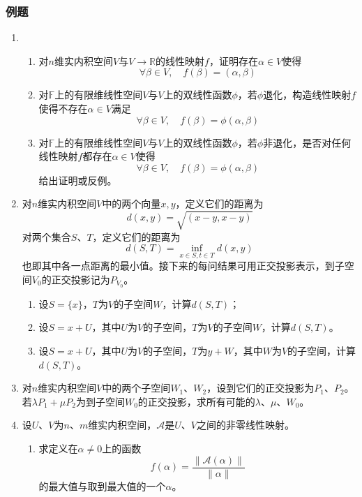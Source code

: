 \documentclass[a4paper,UTF8,fontset=windows,AutoFakeBold]{ctexart}
\newcommand*{\ma}{\mathcal{A}}
\begin{document}
\subsubsection{例题}
\begin{enumerate}
    \item
    \begin{enumerate}
        \item 对$n$维实内积空间$V$与$V\to\mathbb{R}$的线性映射$f$，证明存在$\alpha\in V$使得
        $$\forall\beta\in V,\quad f(\beta)=(\alpha,\beta)$$
        \item 对$\mathbb{F}$上的有限维线性空间$V$与$V$上的双线性函数$\phi$，若$\phi$退化，构造线性映射$f$使得不存在$\alpha\in V$满足
        $$\forall\beta\in V,\quad f(\beta)=\phi(\alpha,\beta)$$
        \item 对$\mathbb{F}$上的有限维线性空间$V$与$V$上的双线性函数$\phi$，若$\phi$非退化，是否对任何线性映射$f$都存在$\alpha\in V$使得
        $$\forall\beta\in V,\quad f(\beta)=\phi(\alpha,\beta)$$
        给出证明或反例。
    \end{enumerate}

    \item
    对$n$维实内积空间$V$中的两个向量$x,y$，定义它们的距离为
    $$d(x,y)=\sqrt{(x-y,x-y)}$$
    对两个集合$S$、$T$，定义它们的距离为
    $$d(S,T)=\inf_{x\in S,t\in T}d(x,y)$$
    也即其中各一点距离的最小值。接下来的每问结果可用正交投影表示，到子空间$V_0$的正交投影记为$P_{V_0}$。
    \begin{enumerate}
        \item 设$S=\{x\}$，$T$为$V$的子空间$W$，计算$d(S,T)$；
        \item 设$S=x+U$，其中$U$为$V$的子空间，$T$为$V$的子空间$W$，计算$d(S,T)$。
        \item 设$S=x+U$，其中$U$为$V$的子空间，$T$为$y+W$，其中$W$为$V$的子空间，计算$d(S,T)$。
    \end{enumerate}

    \item 对$n$维实内积空间$V$中的两个子空间$W_1$、$W_2$，设到它们的正交投影为$P_1$、$P_2$。若$\lambda P_1+\mu P_2$为到子空间$W_0$的正交投影，求所有可能的$\lambda$、$\mu$、$W_0$。

    \item
    设$U$、$V$为$n$、$m$维实内积空间，$\ma$是$U$、$V$之间的非零线性映射。
    \begin{enumerate}
        \item 求定义在$\alpha\ne0$上的函数
        $$f(\alpha)=\frac{\|\ma(\alpha)\|}{\|\alpha\|}$$
        的最大值与取到最大值的一个$\alpha$。


\end{enumerate}
\end{enumerate}
\end{document}

